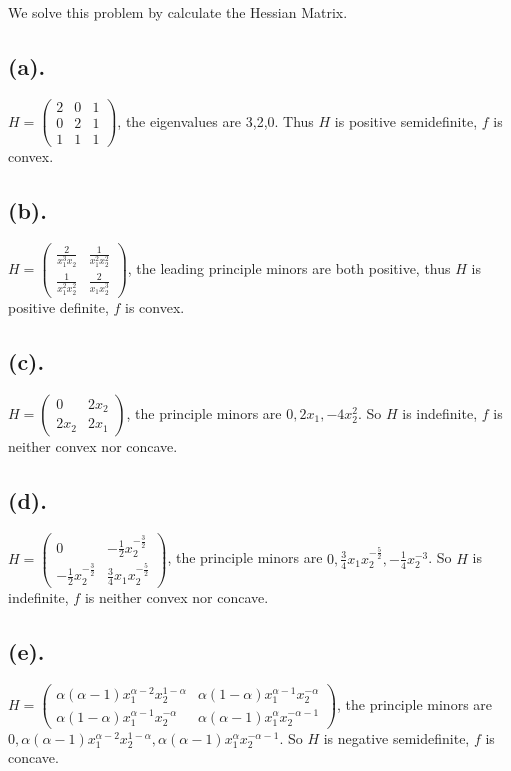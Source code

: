 \documentclass[12pt,letterpaper]{article}
\begin{document}
\section{}
We solve this problem by calculate the Hessian Matrix.
\subsection*{(a).}
$H=\begin{pmatrix}
    2&0&1\\
    0&2&1\\
    1&1&1
\end{pmatrix}$, the eigenvalues are 3,2,0. Thus $H$ is positive semidefinite, $f$ is convex.
\subsection*{(b).}
$H=\begin{pmatrix}
    \frac{2}{x_1^3x_2}&\frac{1}{x_1^2x_2^2}\\
    \frac{1}{x_1^2x_2^2}&\frac{2}{x_1x_2^3}
\end{pmatrix}$, the leading principle minors are both positive, thus $H$ is positive definite, $f$ is convex.
\subsection*{(c).}
$H=\begin{pmatrix}
    0&2x_2\\
    2x_2&2x_1
\end{pmatrix}$, the principle minors are $0,2x_1,-4x_2^2$. So $H$ is indefinite, $f$ is neither convex nor concave.
\subsection*{(d).}
$H=\begin{pmatrix}
    0&-\frac{1}{2}x_2^{-\frac{3}{2}}\\
    -\frac{1}{2}x_2^{-\frac{3}{2}}&\frac{3}{4}x_1x_2^{-\frac{5}{2}}
\end{pmatrix}$, the principle minors are $0,\frac{3}{4}x_1x_2^{-\frac{5}{2}},-\frac{1}{4}x_2^{-3}$. So $H$ is indefinite, $f$ is neither convex nor concave.
\subsection*{(e).}
$H=\begin{pmatrix}
    \alpha(\alpha-1)x_1^{\alpha-2}x_2^{1-\alpha}&\alpha(1-\alpha)x_1^{\alpha-1}x_2^{-\alpha}\\
    \alpha(1-\alpha)x_1^{\alpha-1}x_2^{-\alpha}&\alpha(\alpha-1)x_1^{\alpha}x_2^{-\alpha-1}
\end{pmatrix}$, the principle minors are $0,\alpha(\alpha-1)x_1^{\alpha-2}x_2^{1-\alpha},\alpha(\alpha-1)x_1^{\alpha}x_2^{-\alpha-1}$. So $H$ is negative semidefinite, $f$ is concave.
\end{document}
